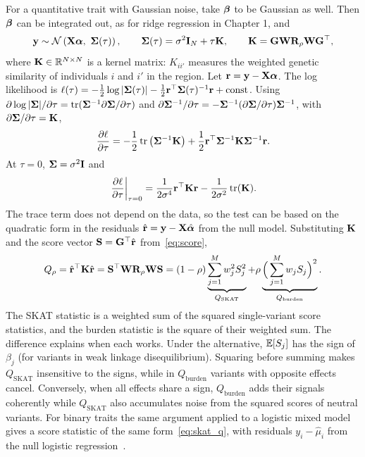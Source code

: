 For a quantitative trait with Gaussian noise, take $\boldsymbol{\beta}$ to be Gaussian as well. Then $\boldsymbol{\beta}$ can be integrated out, as for ridge regression in Chapter 1, and
\begin{equation}
  \vy\sim\Normal\left(\mX\valpha,\ \mSigma(\tau)\right), \qquad \mSigma(\tau) = \sigma^2\mI_N + \tau\mK, \qquad \mK = \mG\mW\mR_\rho\mW\mG^\top ,
\end{equation}
where $\mathbf{K}\in\mathbb{R}^{N\times N}$ is a kernel matrix: $K_{ii'}$ measures the weighted genetic similarity of individuals $i$ and $i'$ in the region. Let $\mathbf{r}=\mathbf{y}-\mathbf{X}\boldsymbol{\alpha}$. The log likelihood is $\ell(\tau)=-\frac{1}{2}\log|\boldsymbol{\Sigma}(\tau)|-\frac{1}{2}\mathbf{r}^\top\boldsymbol{\Sigma}(\tau)^{-1}\mathbf{r}+\text{const}$. Using $\partial\log|\boldsymbol{\Sigma}|/\partial\tau=\operatorname{tr}(\boldsymbol{\Sigma}^{-1}\partial\boldsymbol{\Sigma}/\partial\tau)$ and $\partial\boldsymbol{\Sigma}^{-1}/\partial\tau=-\boldsymbol{\Sigma}^{-1}(\partial\boldsymbol{\Sigma}/\partial\tau)\boldsymbol{\Sigma}^{-1}$, with $\partial\boldsymbol{\Sigma}/\partial\tau=\mathbf{K}$,
\begin{equation}
  \frac{\partial\ell}{\partial\tau} = -\frac{1}{2}\operatorname{tr}\left(\boldsymbol{\Sigma}^{-1}\mathbf{K}\right) + \frac{1}{2}\mathbf{r}^\top\boldsymbol{\Sigma}^{-1}\mathbf{K}\boldsymbol{\Sigma}^{-1}\mathbf{r} .
\end{equation}
At $\tau=0$, $\boldsymbol{\Sigma}=\sigma^2\mathbf{I}$ and
\begin{equation}
  \left.\frac{\partial\ell}{\partial\tau}\right|_{\tau=0} = \frac{1}{2\sigma^4}\mathbf{r}^\top\mathbf{K}\mathbf{r} - \frac{1}{2\sigma^2}\operatorname{tr}(\mathbf{K}) .
\end{equation}
The trace term does not depend on the data, so the test can be based on the quadratic form in the residuals $\hat{\mathbf{r}}=\mathbf{y}-\mathbf{X}\hat{\boldsymbol{\alpha}}$ from the null model. Substituting $\mathbf{K}$ and the score vector $\mathbf{S}=\mathbf{G}^\top\hat{\mathbf{r}}$ from~\eqref{eq:score},
\begin{equation}
  Q_\rho = \hat{\mathbf{r}}^\top\mathbf{K}\hat{\mathbf{r}} = \mathbf{S}^\top\mathbf{W}\mathbf{R}_\rho\mathbf{W}\mathbf{S}
  = (1-\rho)\underbrace{\sum_{j=1}^M w_j^2S_j^2}_{Q_{\text{SKAT}}} + \rho\underbrace{\Big(\sum_{j=1}^M w_jS_j\Big)^2}_{Q_{\text{burden}}} .
  \label{eq:skat_q}
\end{equation}
The SKAT statistic is a weighted sum of the squared single-variant score statistics, and the burden statistic is the square of their weighted sum. The difference explains when each works. Under the alternative, $\mathbb{E}[S_j]$ has the sign of $\beta_j$ (for variants in weak linkage disequilibrium). Squaring before summing makes $Q_{\text{SKAT}}$ insensitive to the signs, while in $Q_{\text{burden}}$ variants with opposite effects cancel. Conversely, when all effects share a sign, $Q_{\text{burden}}$ adds their signals coherently while $Q_{\text{SKAT}}$ also accumulates noise from the squared scores of neutral variants. For binary traits the same argument applied to a logistic mixed model gives a score statistic of the same form~\eqref{eq:skat_q}, with residuals $y_i-\hat\mu_i$ from the null logistic regression~\citep{wu2011}.

